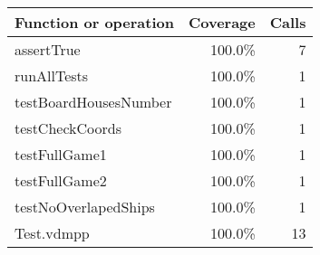 \bigskip
\begin{longtable}{|l|r|r|}
\hline
Function or operation & Coverage & Calls \\
\hline
\hline
assertTrue & 100.0\% & 7 \\
\hline
runAllTests & 100.0\% & 1 \\
\hline
testBoardHousesNumber & 100.0\% & 1 \\
\hline
testCheckCoords & 100.0\% & 1 \\
\hline
testFullGame1 & 100.0\% & 1 \\
\hline
testFullGame2 & 100.0\% & 1 \\
\hline
testNoOverlapedShips & 100.0\% & 1 \\
\hline
\hline
Test.vdmpp & 100.0\% & 13 \\
\hline
\end{longtable}

